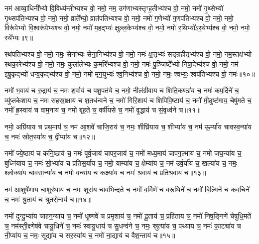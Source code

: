 {\anuvakamend[{कु॒लु॒ञ्चाना॒म्पत॑ये॒ नमो॒ नमो\-ऽश्व॑पतिभ्य॒स्त्रीणि॑ च॥३॥}]}

नम॑ आव्या॒धिनी᳚भ्यो वि॒विध्य॑न्तीभ्यश्च वो॒ नमो॒ नम॒ उग॑णाभ्यस्तृꣳह॒तीभ्य॑श्च वो॒ नमो॒ नमो॑ गृ॒थ्सेभ्यो॑ गृ॒थ्सप॑तिभ्यश्च वो॒ नमो॒ नमो॒ व्राते᳚भ्यो॒ व्रात॑पतिभ्यश्च वो॒ नमो॒ नमो॑ ग॒णेभ्यो॑ ग॒णप॑तिभ्यश्च वो॒ नमो॒ नमो॒ विरू॑पेभ्यो वि॒श्वरू॑पेभ्यश्च वो॒ नमो॒ नमो॑ म॒हद्भ्यः॑ क्षुल्ल॒केभ्य॑श्च वो॒ नमो॒ नमो॑ र॒थिभ्यो॑\-ऽर॒थेभ्य॑श्च वो॒ नमो॒ नमो॒ रथे᳚भ्यः॥९॥

रथ॑पतिभ्यश्च वो॒ नमो॒ नमः॒ सेना᳚भ्यः सेना॒निभ्य॑श्च वो॒ नमो॒ नमः॑ क्ष॒त्तृभ्यः॑ सङ्ग्रही॒तृभ्य॑श्च वो॒ नमो॒ नम॒स्तक्ष॑भ्यो रथका॒रेभ्य॑श्च वो॒ नमो॒ नमः॒ कुला॑लेभ्यः क॒र्मारे᳚भ्यश्च वो॒ नमो॒ नमः॑ पु॒ञ्जिष्टे᳚भ्यो निषा॒देभ्य॑श्च वो॒ नमो॒ नम॑ इषु॒कृद्भ्यो॑ धन्व॒कृद्भ्य॑श्च वो॒ नमो॒ नमो॑ मृग॒युभ्यः॑ श्व॒निभ्य॑श्च वो॒ नमो॒ नमः॒ श्वभ्यः॒ श्वप॑तिभ्यश्च वो॒ नमः॑॥१०॥

{\anuvakamend[{रथे᳚भ्यः॒ श्वप॑तिभ्यश्च॒ द्वे च॑॥४॥}]}

नमो॑ भ॒वाय॑ च रु॒द्राय॑ च॒ नमः॑ श॒र्वाय॑ च पशु॒पत॑ये च॒ नमो॒ नील॑ग्रीवाय च शिति॒कण्ठा॑य च॒ नमः॑ कप॒र्दिने॑ च॒ व्यु॑प्तकेशाय च॒ नमः॑ सहस्रा॒क्षाय॑ च श॒तध॑न्वने च॒ नमो॑ गिरि॒शाय॑ च शिपिवि॒ष्टाय॑ च॒ नमो॑ मी॒ढुष्ट॑माय॒ चेषु॑मते च॒ नमो᳚ ह्र॒स्वाय॑ च वाम॒नाय॑ च॒ नमो॑ बृह॒ते च॒ वर्\mbox{}षी॑यसे च॒ नमो॑ वृ॒द्धाय॑ च सं॒वृध्व॑ने च॥११॥

नमो॒ अग्रि॑याय च प्रथ॒माय॑ च॒ नम॑ आ॒शवे॑ चाजि॒राय॑ च॒ नमः॒ शीघ्रि॑याय च॒ शीभ्या॑य च॒ नम॑ ऊ॒र्म्या॑य चावस्व॒न्या॑य च॒ नमः॑ स्रोत॒स्या॑य च॒ द्वीप्या॑य च॥१२॥

{\anuvakamend[{सं॒ वृध्व॑ने च॒ पञ्च॑विꣳशतिश्च॥५॥}]}

नमो᳚ ज्ये॒ष्ठाय॑ च कनि॒ष्ठाय॑ च॒ नमः॑ पूर्व॒जाय॑ चापर॒जाय॑ च॒ नमो॑ मध्य॒माय॑ चापग॒ल्भाय॑ च॒ नमो॑ जघ॒न्या॑य च॒ बुध्नि॑याय च॒ नमः॑ सो॒भ्या॑य च प्रतिस॒र्या॑य च॒ नमो॒ याम्या॑य च॒ क्षेम्या॑य च॒ नम॑ उर्व॒र्या॑य च॒ खल्या॑य च॒ नमः॒ श्लोक्या॑य चावसा॒न्या॑य च॒ नमो॒ वन्या॑य च॒ कक्ष्या॑य च॒ नमः॑ श्र॒वाय॑ च प्रतिश्र॒वाय॑ च॥१३॥

नम॑ आ॒शुषे॑णाय चा॒शुर॑थाय च॒ नमः॒ शूरा॑य चावभिन्द॒ते च॒ नमो॑ व॒र्मिणे॑ च वरू॒थिने॑ च॒ नमो॑ बि॒ल्मिने॑ च कव॒चिने॑ च॒ नमः॑ श्रु॒ताय॑ च श्रुतसे॒नाय॑ च॥१४॥

{\anuvakamend[{प्र॒ति॒श्र॒वाय॑ च॒ पञ्च॑विꣳशतिश्च॥६॥}]}

नमो॑ दुन्दु॒भ्या॑य चाहन॒न्या॑य च॒ नमो॑ धृ॒ष्णवे॑ च प्रमृ॒शाय॑ च॒ नमो॑ दू॒ताय॑ च॒ प्रहि॑ताय च॒ नमो॑ निष॒ङ्गिणे॑ चेषुधि॒मते॑ च॒ नम॑स्ती॒क्ष्णेष॑वे चायु॒धिने॑ च॒ नमः॑ स्वायु॒धाय॑ च सु॒धन्व॑ने च॒ नमः॒ स्रुत्या॑य च॒ पथ्या॑य च॒ नमः॑ का॒ट्या॑य च नी॒प्या॑य च॒ नमः॒ सूद्या॑य च सर॒स्या॑य च॒ नमो॑ ना॒द्याय॑ च वैश॒न्ताय॑ च॥१५॥

